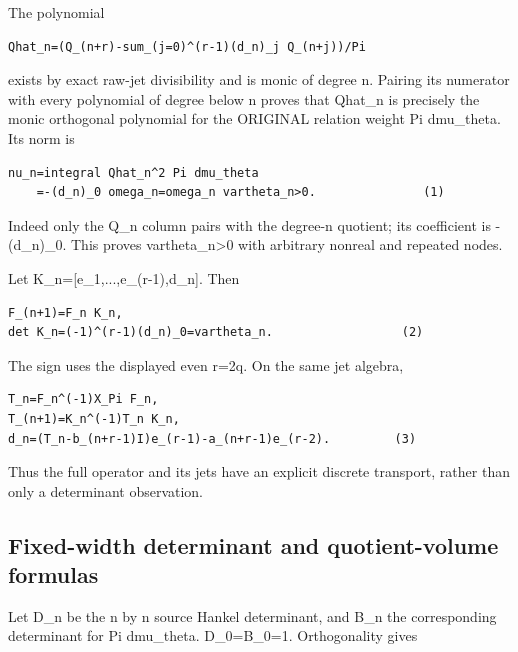 The polynomial

\begin{Verbatim}[breaklines=true,breakanywhere=true,fontsize=\small]
Qhat_n=(Q_(n+r)-sum_(j=0)^(r-1)(d_n)_j Q_(n+j))/Pi
\end{Verbatim}

exists by exact raw-jet divisibility and is monic of degree n. Pairing
its numerator with every polynomial of degree below n proves that
Qhat\_n is precisely the monic orthogonal polynomial for the ORIGINAL
relation weight Pi dmu\_theta. Its norm is

\begin{Verbatim}[breaklines=true,breakanywhere=true,fontsize=\small]
nu_n=integral Qhat_n^2 Pi dmu_theta
    =-(d_n)_0 omega_n=omega_n vartheta_n>0.               (1)
\end{Verbatim}

Indeed only the Q\_n column pairs with the degree-n quotient; its
coefficient is -(d\_n)\_0. This proves vartheta\_n\textgreater0 with
arbitrary nonreal and repeated nodes.

Let K\_n={[}e\_1,...,e\_(r-1),d\_n{]}. Then

\begin{Verbatim}[breaklines=true,breakanywhere=true,fontsize=\small]
F_(n+1)=F_n K_n,
det K_n=(-1)^(r-1)(d_n)_0=vartheta_n.                  (2)
\end{Verbatim}

The sign uses the displayed even r=2q. On the same jet algebra,

\begin{Verbatim}[breaklines=true,breakanywhere=true,fontsize=\small]
T_n=F_n^(-1)X_Pi F_n,
T_(n+1)=K_n^(-1)T_n K_n,
d_n=(T_n-b_(n+r-1)I)e_(r-1)-a_(n+r-1)e_(r-2).         (3)
\end{Verbatim}

Thus the full operator and its jets have an explicit discrete transport,
rather than only a determinant observation.

\subsection[\hspace{0.4em}Fixed-width determinant and quotient-volume
formulas]{Fixed-width determinant and quotient-volume
formulas}\label{confluent-transfer-fixed-width-determinant-and-quotient-volume-formulas}

Let D\_n be the n by n source Hankel determinant, and B\_n the
corresponding determinant for Pi dmu\_theta. D\_0=B\_0=1. Orthogonality
gives

